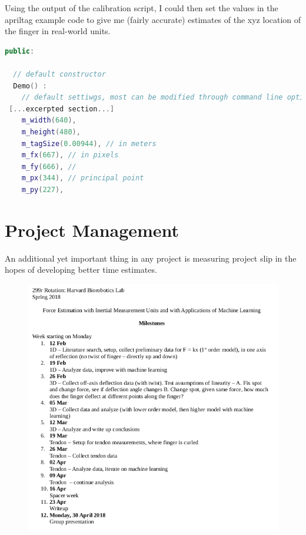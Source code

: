 \documentclass[preprint,12pt,3p]{elsarticle}
\begin{document}
Using the output of the calibration script, I could then set the values in the apriltag example code
to give me (fairly accurate) estimates of the xyz location of the finger in real-world units.



\begin{lstlisting}[language=C++,breaklines]
public:

  // default constructor
  Demo() :
    // default settiwgs, most can be modified through command line options (see below)
 [...excerpted section...]
    m_width(640),
    m_height(480),
    m_tagSize(0.00944), // in meters
    m_fx(667), // in pixels
    m_fy(666), //
    m_px(344), // principal point
    m_py(227),
\end{lstlisting}



\section{Project Management}

An additional yet important thing in any project is measuring project slip in the hopes of
developing better time estimates. 

\begin{figure}[H]
\centering
\includegraphics[width=.8\textwidth]{images/misc/timeline.png}
\end{figure}
\end{document}
